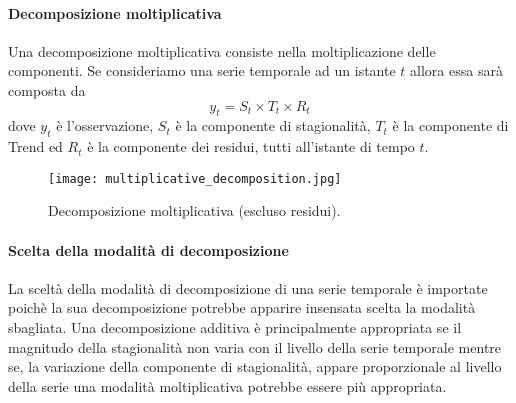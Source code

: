 \paragraph{Decomposizione moltiplicativa} 
Una decomposizione moltiplicativa consiste nella
moltiplicazione delle componenti. Se consideriamo una serie temporale ad un 
istante $t$ allora essa sarà composta da
\[ y_t = S_t \times T_t \times R_t \]
dove $y_t$ è l'osservazione, $S_t$ è la componente di stagionalità, 
$T_t$ è la componente di Trend ed $R_t$ è la componente dei residui, tutti
all'istante di tempo $t$.
\begin{figure}[H]
    \centering
    \texttt{[image: multiplicative\_decomposition.jpg]}
    \caption{Decomposizione moltiplicativa (escluso residui).}
\end{figure}

\paragraph{Scelta della modalità di decomposizione}
La sceltà della modalità di decomposizione di una serie temporale è importate poichè
la sua decomposizione potrebbe apparire insensata scelta la modalità sbagliata.
Una decomposizione additiva è principalmente appropriata se il magnitudo della 
stagionalità non varia con il livello della serie temporale mentre se, la variazione
della componente di stagionalità, appare proporzionale al livello della serie una modalità
moltiplicativa potrebbe essere più appropriata.





